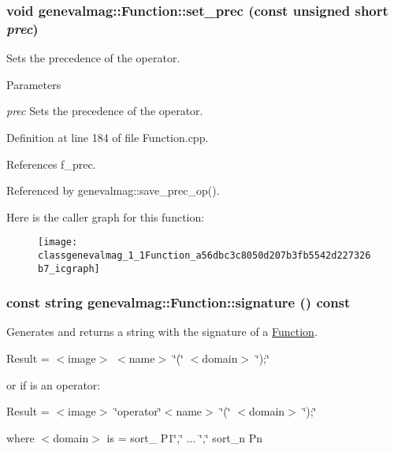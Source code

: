 \hypertarget{classgenevalmag_1_1Function_a56dbc3c8050d207b3fb5542d227326b7}{
\subsubsection[{set\_\-prec}]{\setlength{\rightskip}{0pt plus 5cm}void genevalmag::Function::set\_\-prec (const unsigned short {\em prec})}}
\label{classgenevalmag_1_1Function_a56dbc3c8050d207b3fb5542d227326b7}
Sets the precedence of the operator. 
\begin{DoxyParams}{Parameters}
\item[{\em prec}]Sets the precedence of the operator. \end{DoxyParams}


Definition at line 184 of file Function.cpp.



References f\_\-prec.



Referenced by genevalmag::save\_\-prec\_\-op().



Here is the caller graph for this function:\nopagebreak
\begin{figure}[H]
\begin{center}
\leavevmode
\texttt{[image: classgenevalmag\_1\_1Function\_a56dbc3c8050d207b3fb5542d227326b7\_icgraph]}
\end{center}
\end{figure}


\hypertarget{classgenevalmag_1_1Function_a13bd09282fcdf0edec0b8881939d6928}{
\subsubsection[{signature}]{\setlength{\rightskip}{0pt plus 5cm}const string genevalmag::Function::signature () const}}
\label{classgenevalmag_1_1Function_a13bd09282fcdf0edec0b8881939d6928}
Generates and returns a string with the signature of a \hyperlink{classgenevalmag_1_1Function}{Function}.\par
 \par
 Result = $<$image$>$ $<$name$>$ \char`\"{}(\char`\"{} $<$domain$>$ \char`\"{});\char`\"{}\par
 \par
 or if is an operator:\par
 \par
 Result = $<$image$>$ \char`\"{}operator\char`\"{}$<$name$>$ \char`\"{}(\char`\"{} $<$domain$>$ \char`\"{});\char`\"{}\par
 \par
 where $<$domain$>$ is = sort\_ P1\char`\"{},\char`\"{} ... \char`\"{},\char`\"{} sort\_\-n Pn\par


